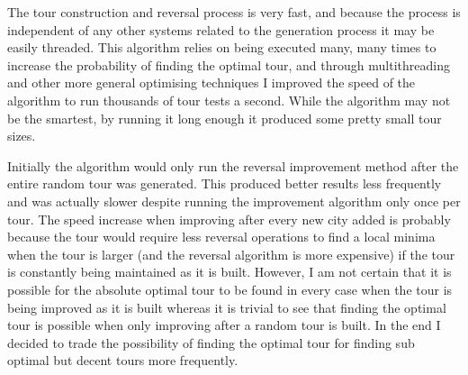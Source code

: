 \documentclass[a4paper,11pt]{article}
\begin{document}
The tour construction and reversal process is very fast, and because the
process is independent of any other systems related to the generation process
it may be easily threaded. This algorithm relies on being executed many, many
times to increase the probability of finding the optimal tour, and through
multithreading and other more general optimising techniques I improved the
speed of the algorithm to run thousands of tour tests a second. While the
algorithm may not be the smartest, by running it long enough it produced some
pretty small tour sizes.

Initially the algorithm would only run the reversal improvement method after
the entire random tour was generated. This produced better results less
frequently and was actually slower despite running the improvement algorithm
only once per tour. The speed increase when improving after every new city
added is probably because the tour would require less reversal operations to
find a local minima when the tour is larger (and the reversal algorithm is more
expensive) if the tour is constantly being maintained as it is built. However,
I am not certain that it is possible for the absolute optimal tour to be found
in every case when the tour is being improved as it is built whereas it is
trivial to see that finding the optimal tour is possible when only improving
after a random tour is built. In the end I decided to trade the possibility of
finding the optimal tour for finding sub optimal but decent tours more
frequently.
\end{document}
